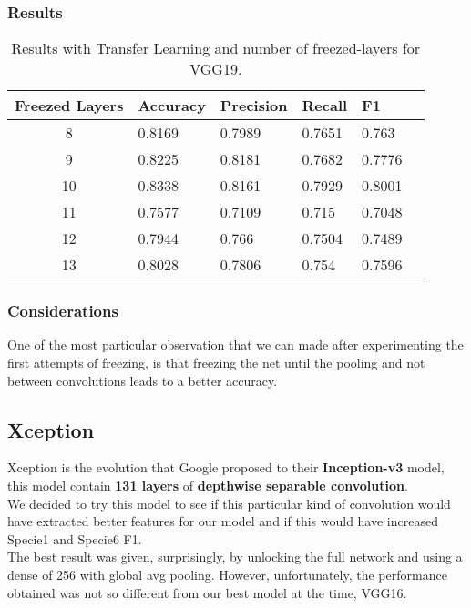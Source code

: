 \documentclass[11pt]{article}
\begin{document}
\subsubsection{Results}
\begin{table}[ht]
\centering
\begin{adjustbox}{width=230}
\small
\begin{tabular}{|c|l|l|l|l|l}

\hline \bf Freezed Layers & \bf Accuracy & \bf Precision & \bf Recall & \bf F1 \\ \hline
8 & 0.8169 & 0.7989 & 0.7651 & 0.763\\
9 & 0.8225 & 0.8181 & 0.7682 & 0.7776\\
10 & 0.8338 & 0.8161 & 0.7929 & 0.8001\\
11 & 0.7577 & 0.7109 & 0.715 & 0.7048\\
12 & 0.7944 & 0.766 & 0.7504 & 0.7489\\
13 & 0.8028 & 0.7806 & 0.754 & 0.7596\\
\hline
\end{tabular}
\end{adjustbox}
\caption{Results with Transfer Learning and number of freezed-layers for VGG19.}
\label{vgg19_results}
\end{table}

\subsubsection{Considerations}
One of the most particular observation that we can made after experimenting the first attempts of freezing, is that freezing the net
until the pooling and not between convolutions leads to a better accuracy.

\subsection{Xception}
Xception is the evolution that Google proposed to their \textbf{Inception-v3} model, this model contain \textbf{131 layers} of \textbf{depthwise separable convolution}.\\[0.1cm]
We decided to try this model to see if this particular kind of convolution would have extracted better features for our model and if this would have increased Specie1 and Specie6 F1.\\[0.1cm]
The best result was given, surprisingly, by unlocking the full network and using a dense of 256 with global avg pooling.
However, unfortunately, the performance obtained was not so different from our best model at the time, VGG16.
\end{document}
